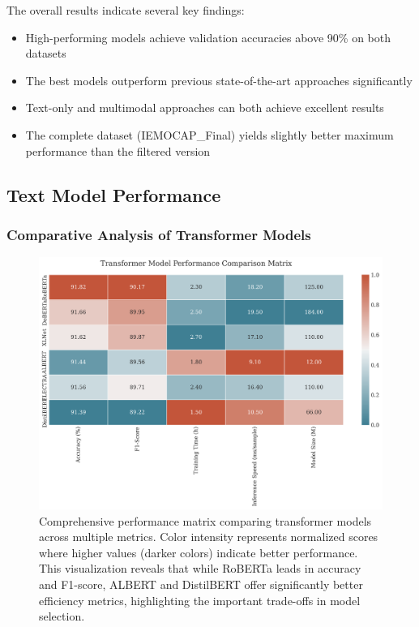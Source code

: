 \documentclass[12pt]{article}
\begin{document}
The overall results indicate several key findings:
\begin{itemize}
    \item High-performing models achieve validation accuracies above 90\% on both datasets
    \item The best models outperform previous state-of-the-art approaches significantly
    \item Text-only and multimodal approaches can both achieve excellent results
    \item The complete dataset (IEMOCAP\_Final) yields slightly better maximum performance than the filtered version
\end{itemize}

\subsection{Text Model Performance}
\subsubsection{Comparative Analysis of Transformer Models}
\begin{figure}[h]
    \centering
    \includegraphics[width=0.95\linewidth]{Figures/model_comparison_matrix.png}
    \caption{Comprehensive performance matrix comparing transformer models across multiple metrics. Color intensity represents normalized scores where higher values (darker colors) indicate better performance. This visualization reveals that while RoBERTa leads in accuracy and F1-score, ALBERT and DistilBERT offer significantly better efficiency metrics, highlighting the important trade-offs in model selection.}
    \label{fig:model_comparison_matrix}
\end{figure}
\end{document}
